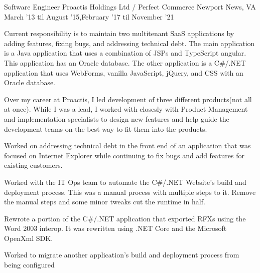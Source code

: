 

\begin{cventries}

    \cventry
    {Software Engineer} %
    {Proactis Holdings Ltd / Perfect Commerce} %
    {Newport News, VA} %
    {March '13 til August '15,\newline February '17 til November '21} %
    {
        \begin{cvitems} %
        \item {Current responsibility is to maintain two multitenant SaaS applications by adding features, fixing bugs, and addressing technical debt.
            The main application is a Java application that uses a combination of JSPs and TypeScript angular. This application has an Oracle database.
            The other application is a C\#/.NET application that uses WebForms, vanilla JavaScript, jQuery, and CSS with an Oracle database.}
        \item {Over my career at Proactis, I led development of three different products(not all at once). 
            While I was a lead, I worked with closesly with Product Management and implementation specialists to design new features 
            and help guide the development teams on the best way to fit them into the products.}
        \item {Worked on addressing technical debt in the front end of an application that was focused on Internet Explorer while continuing to fix bugs and add features for existing customers. }
        \item {Worked with the IT Ops team to automate the C\#/.NET Website's build and deployment process.
            This was a manual process with multiple steps to it. Remove the manual steps and some minor tweaks cut the runtime in half.} 
        \item {Rewrote a portion of the C\#/.NET application that exported RFXs using the Word 2003 interop.
            It was rewritten using .NET Core and the Microsoft OpenXml SDK.}
        \item {Worked to migrate another application's build and deployment process from being configured 
}
\end{cvitems}}
\end{cventries}
